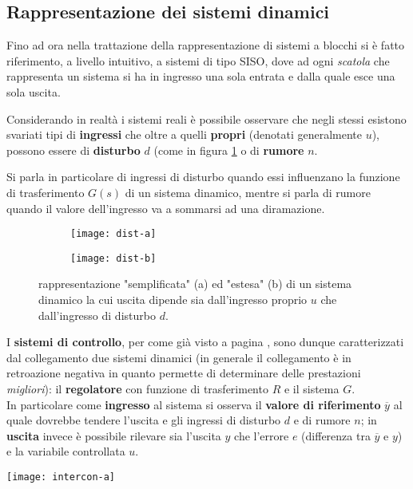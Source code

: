 	\subsection{Rappresentazione dei sistemi dinamici}
		Fino ad ora nella trattazione della rappresentazione di sistemi a blocchi si è fatto riferimento, a livello intuitivo, a sistemi di tipo SISO, dove ad ogni \textit{scatola} che rappresenta un sistema si ha in ingresso una sola entrata e dalla quale esce una sola uscita. 
		\begin{concetto}
			Considerando in realtà i sistemi reali è possibile osservare che negli stessi esistono svariati tipi di \textbf{ingressi} che oltre a quelli \textbf{propri} (denotati generalmente $u$), possono essere di \textbf{disturbo} $d$ (come in figura \ref{fig:int:disturbo} o di \textbf{rumore} $n$.
		\end{concetto}
		\begin{nota}
			Si parla in particolare di ingressi di disturbo quando essi influenzano la funzione di trasferimento $G(s)$ di un sistema dinamico, mentre si parla di rumore quando il valore dell'ingresso va a sommarsi ad una diramazione.
		\end{nota}
		
		\begin{figure}[bht]
			\centering
			\begin{subfigure}{0.48\linewidth}
				\centering \texttt{[image: dist-a]} \caption{}
			\end{subfigure}
			\begin{subfigure}{0.48\linewidth}
				\centering \texttt{[image: dist-b]} \caption{}
			\end{subfigure}
			\caption{rappresentazione "semplificata" (a) ed "estesa" (b) di un sistema dinamico la cui uscita dipende sia dall'ingresso proprio $u$ che dall'ingresso di disturbo $d$.}
			\label{fig:int:disturbo}
		\end{figure} 
		
		\begin{concetto}
			I \textbf{sistemi di controllo}, per come già visto a pagina \pageref{sec:sistemacontrollo}, sono dunque caratterizzati dal collegamento due sistemi dinamici (in generale il collegamento è in retroazione negativa in quanto permette di determinare delle prestazioni \textit{migliori}): il \textbf{regolatore} con funzione di trasferimento $R$ e il sistema $G$. \\
			In particolare come \textbf{ingresso} al sistema si osserva il \textbf{valore di riferimento} $\overline y$ al quale dovrebbe tendere l'uscita e gli ingressi di disturbo $d$ e di rumore $n$; in \textbf{uscita} invece è possibile rilevare sia l'uscita $y$ che l'errore $e$ (differenza tra $\overline y$ e $y$) e la variabile controllata $u$.
			\begin{center}
				\texttt{[image: intercon-a]}
			\end{center}
		\end{concetto}
		
